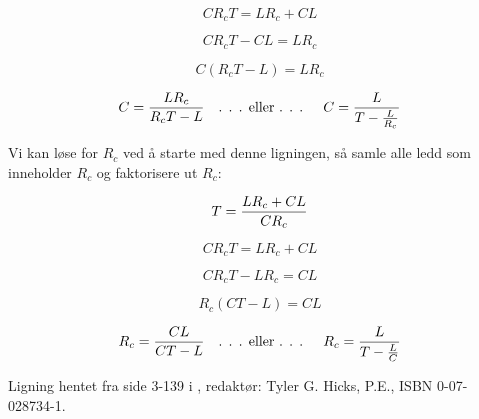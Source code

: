 $$C R_c T = L R_c + C L$$

$$C R_c T - CL = L R_c$$

$$C (R_c T - L) = L R_c$$

$$C = {{L R_c} \over {R_c T} - L} \hbox{\hskip 10pt . . . eller . . . \hskip 10pt} C = {L \over T - {L \over R_c}}$$

\vskip 20pt

Vi kan løse for $R_c$ ved å starte med denne ligningen, så samle alle ledd som inneholder $R_c$ og faktorisere ut $R_c$:

$$T = {{L R_c + C L} \over C R_c}$$

$$C R_c T = L R_c + C L$$

$$C R_c T - L R_c = C L$$

$$R_c (CT - L) = C L$$

$$R_c = {CL \over {CT - L}} \hbox{\hskip 10pt . . . eller . . . \hskip 10pt} R_c = {L \over T - {L \over C}}$$

\vskip 10pt

Ligning hentet fra side 3-139 i , redaktør: Tyler G. Hicks, P.E., ISBN 0-07-028734-1.




